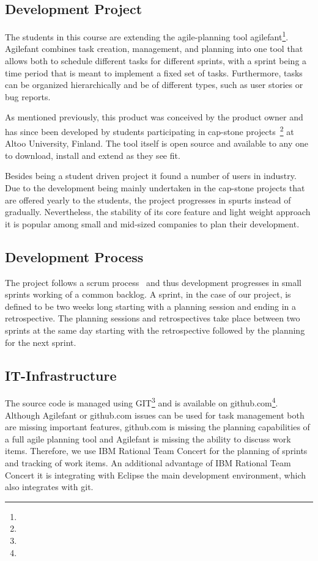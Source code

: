 \subsection{Development Project}
The students in this course are extending the agile-planning tool agilefant\footnote{}.
Agilefant combines task creation, management, and planning into one tool that allows both to schedule different tasks for different sprints, with a sprint being a time period that is meant to implement a fixed set of tasks.
Furthermore, tasks can be organized hierarchically and be of different types, such as user stories or bug reports.
 
As mentioned previously, this product was conceived by the product owner and has since been developed by students participating in cap-stone projects~\footnote{} at Altoo University, Finland.
The tool itself is open source and available to any one to download, install and extend as they see fit.

Besides being a student driven project it found a number of users in industry.
Due to the development being mainly undertaken in the cap-stone projects that are offered yearly to the students, the project progresses in spurts instead of gradually.
Nevertheless, the stability of its core feature and light weight approach it is popular among small and mid-sized companies to plan their development.

\subsection{Development Process}
The project follows a scrum process~\cite{} and thus development progresses in small sprints working of a common backlog.
A sprint, in the case of our project, is defined to be two weeks long starting with a planning session and ending in a retrospective.
The planning sessions and retrospectives take place between two sprints at the same day starting with the retrospective followed by the planning for the next sprint.

\subsection{IT-Infrastructure}
The source code is managed using GIT\footnote{} and is available on github.com\footnote{}.
Although Agilefant or github.com issues can be used for task management both are missing important features, github.com is missing the planning capabilities of a full agile planning tool and Agilefant is missing the ability to discuss work items.
Therefore, we use IBM Rational Team Concert for the planning of sprints and tracking of work items.
An additional advantage of IBM Rational Team Concert it is integrating with Eclipse the main development environment, which also integrates with git. 

